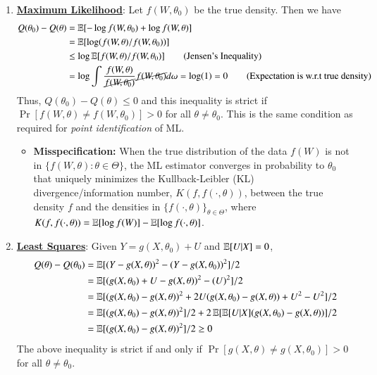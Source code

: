 \documentclass[../main.tex]{subfiles}
\begin{document}
\begin{enumerate}
	\item \ul{\textbf{Maximum Likelihood}}:
	Let $f(W, \theta_0)$ be the true density. Then we have
	\begin{align*}
		Q(\theta_0) - Q(\theta) &= \operatorname{\mathbb{E}}[-\log f(W, \theta_0) + \log f(W, \theta)] \\
								&= \operatorname{\mathbb{E}}[\log (f(W, \theta)/f(W, \theta_0))] \\
								&\leq \log \operatorname{\mathbb{E}}[f(W, \theta)/f(W, \theta_0)] \text{\tag{Jensen's Inequality}} \\
								&= \log \int \frac{f(W, \theta)}{\cancel{f(W, \theta_0)}}\cancel{f(W, \theta_0)}d\omega = \log (1) = 0 \text{\tag{Expectation is w.r.t true density}}
	\end{align*}
	Thus, $Q(\theta_0) - Q(\theta) \leq 0$ and this inequality is strict if $\Pr[f(W, \theta) \neq f(W, \theta_0)] > 0$ for all $\theta \neq \theta_0$. This is the same condition as required for \emph{point identification} of ML.
	\begin{itemize}
		\item \textbf{Misspecification:} When the true distribution of the data $f(W)$ is not in $\{f(W, \theta): \theta \in \Theta\}$, the ML estimator converges in probability to $\theta_0$ that uniquely minimizes the Kullback-Leibler (KL) divergence/information number, $K(f, f(\cdot, \theta))$, between the true density $f$ and the densities in $\{f(\cdot, \theta)\}_{\theta \in \Theta}$, where $K(f, f(\cdot, \theta)) = \operatorname{\mathbb{E}} [\log f(W)] - \operatorname{\mathbb{E}} [\log f(\cdot, \theta)]$.
	\end{itemize}
	\item \ul{\textbf{Least Squares}}: Given $Y=g(X, \theta_0) + U$ and $\operatorname{\mathbb{E}}[U|X] = 0$, 
	\begin{align*}
		Q(\theta) - Q(\theta_0) &= \operatorname{\mathbb{E}}[(Y - g(X, \theta))^2 - (Y - g(X, \theta_0))^2]/2 \\
								&= \operatorname{\mathbb{E}}[(g(X, \theta_0) + U - g(X, \theta))^2 - (U)^2]/2\\
								&= \operatorname{\mathbb{E}}[(g(X, \theta_0) - g(X, \theta))^2 + 2U(g(X, \theta_0) - g(X, \theta)) + U^2 - U^2]/2\\
								&= \operatorname{\mathbb{E}}[(g(X, \theta_0) - g(X, \theta))^2]/2 + 2\operatorname{\mathbb{E}}[\operatorname{\mathbb{E}}[U|X](g(X, \theta_0) - g(X, \theta))]/2\\
								&= \operatorname{\mathbb{E}}[(g(X, \theta_0) - g(X, \theta))^2]/2 \geq 0
	\end{align*}
	The above inequality is strict if and only if $\Pr[g(X, \theta) \neq g(X, \theta_0)] > 0$ for all $\theta \neq \theta_0$.

\end{enumerate}
\end{document}
